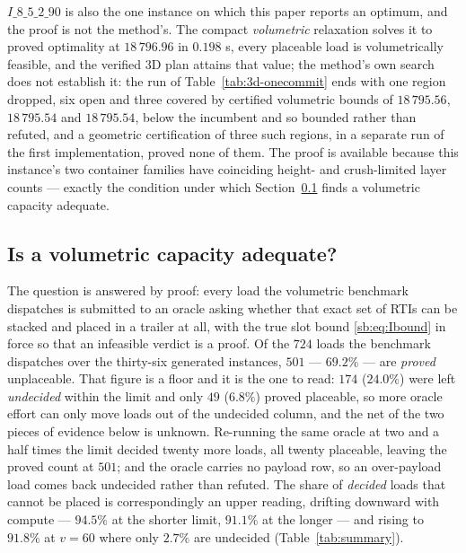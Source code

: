 $I\_8\_5\_2\_90$ is also the one instance on which this paper reports
an optimum, and the proof is not the method's. The compact
\emph{volumetric} relaxation solves it to proved optimality at
$18\,796.96$ in $0.198$ s, every placeable load is volumetrically
feasible, and the verified 3D plan attains that value; the method's own
search does not establish it: the run of Table~\ref{tab:3d-onecommit}
ends with one region dropped, six open and three covered by certified
volumetric bounds of $18\,795.56$, $18\,795.54$ and $18\,795.54$, below
the incumbent and so bounded rather than refuted, and a geometric certification of three such
regions, in a separate run of the first implementation, proved none of
them. The
proof is available because this instance's two container families have
coinciding height- and crush-limited layer counts --- exactly the
condition under which Section~\ref{sec:res-abstraction} finds a
volumetric capacity adequate.

\subsection{Is a volumetric capacity adequate?}
\label{sec:res-abstraction}



The question is answered by proof: every load the volumetric benchmark
dispatches is submitted to an oracle asking whether that exact set of
RTIs can be stacked and placed in a trailer at all, with the true slot
bound \eqref{sb:eq:Ibound} in force so that an infeasible verdict is a
proof. Of the $724$ loads the benchmark dispatches over the thirty-six
generated instances, $501$ --- $69.2\%$ --- are \emph{proved}
unplaceable. That figure is a floor and it is the one to read: $174$
($24.0\%$) were left \emph{undecided} within the limit and only $49$
($6.8\%$) proved placeable, so more oracle effort can only move loads
out of the undecided column, and the net of the two pieces of evidence
below is unknown. Re-running the same oracle at two and a half times the limit
decided twenty more loads, all twenty placeable, leaving the proved
count at $501$; and the oracle carries no payload row, so an
over-payload load comes back undecided rather than refuted. The share
of \emph{decided} loads that cannot be placed is correspondingly an
upper reading, drifting downward with compute --- $94.5\%$ at the
shorter limit, $91.1\%$ at the longer --- and rising to $91.8\%$ at
$v=60$ where only $2.7\%$ are undecided (Table~\ref{tab:summary}).

